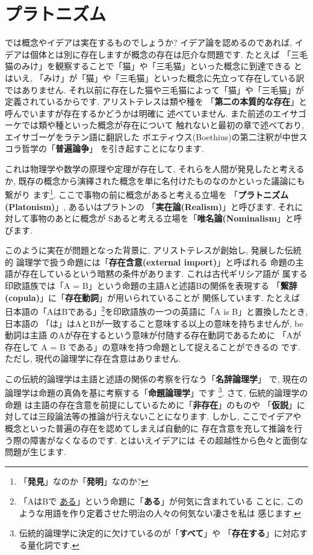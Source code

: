 \documentclass[b5j,8pt,twocolumn]{ltjsarticle}
\begin{document}
\section{プラトニズム}


では概念やイデアは実在するものでしょうか? イデア論を認めるのであれば,
 イデアは個体とは別に存在しますが概念の存在は厄介な問題です. たとえば
「三毛猫のみけ」を観察することで「猫」や「三毛猫」といった概念に到達できる
とはいえ, 「みけ」が「猫」や「三毛猫」といった概念に先立って存在している訳
ではありません. それ以前に存在した猫や三毛猫によって「猫」や「三毛猫」が
定義されているからです. アリストテレスは類や種を
「\textbf{第二の本質的な存在}」と呼んでいますが存在するかどうかは明確に
述べていません. また前述のエイサゴーケでは類や種といった概念が存在について
触れないと最初の章で述べており, エイサゴーゲをラテン語に翻訳した
ボエティウス(Boethius)の第二注釈が中世スコラ哲学の「\textbf{普遍論争}」
を引き起すことになります\cite{普遍論争}.
\newline


これは物理学や数学の原理や定理が存在して, それらを人間が発見したと考えるか,
 既存の概念から演繹された概念を単に名付けたものなのかといった議論にも繋がり
ます\footnote{「\textbf{発見}」なのか「\textbf{発明}」なのか?}.
 ここで事物の前に概念があると考える立場を
「\textbf{プラトニズム(Platonism)}」, あるいはプラトンの
「\textbf{実在論(Realism)}」と呼びます. それに対して事物のあとに概念が
Sあると考える立場を「\textbf{唯名論(Nominalism}」と呼びます.
\newline


このように実在が問題となった背景に, アリストテレスが創始し, 発展した伝統的
論理学で扱う命題には「\textbf{存在含意(external import)}」と呼ばれる
命題の主語が存在しているという暗黙の条件があります. これは古代ギリシア語が
属する印欧語族では「A = B」という命題の主語Aと述語Bの関係を表現する
「\textbf{繋辞(copula)}」に「\textbf{存在動詞}」が用いられていることが
関係しています. たとえば日本語の「AはBである」\footnote{「AはBで
\underline{ある}」という命題に「\textbf{ある}」が何気に含まれている
ことに, このような用語を作り定着させた明治の人々の何気ない凄さを私は
感じます.}を印欧語族の一つの英語に「A is B」と置換したとき, 日本語の
「は」はAとBが一致すること意味する以上の意味を持ちませんが, be動詞は主語
のAが存在するという意味が付随する存在動詞であるために
「Aが存在して A = B である」の意味を持つ命題として捉えることができるの
です. ただし, 現代の論理学に存在含意はありません.
\newline 

この伝統的論理学は主語と述語の関係の考察を行なう「\textbf{名辞論理学}」
で, 現在の論理学は命題の真偽を基に考察する「\textbf{命題論理学}」です
\footnote{伝統的論理学に決定的に欠けているのが「\textbf{すべて}」や
「\textbf{存在する}」に対応する量化詞です.}. さて, 伝統的論理学の命題
は主語の存在含意を前提にしているために「\textbf{非存在}」のものや
「\textbf{仮説}」に対しては三段論法等の推論が行えないことになります.
 しかし, ここでイデアや概念といった普遍の存在を認めてしまえば自動的に
存在含意を充して推論を行う際の障害がなくなるのです. とはいえイデアには
その超越性から色々と面倒な問題が生じます.
\newline
\end{document}

